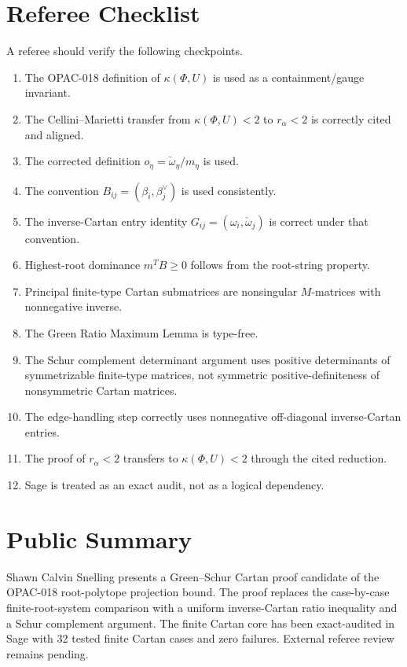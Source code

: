 \documentclass[11pt]{book}
\theoremstyle{definition}
\newcommand{\GS}{Green--Schur}
\begin{document}
\chapter{Referee Checklist}
A referee should verify the following checkpoints.
\begin{enumerate}
\item The OPAC-018 definition of $\kappa(\Phi,U)$ is used as a containment/gauge invariant.
\item The Cellini--Marietti transfer from $\kappa(\Phi,U)<2$ to $r_\alpha<2$ is correctly cited and aligned.
\item The corrected definition $o_\eta=\check\omega_\eta/m_\eta$ is used.
\item The convention $B_{ij}=(\beta_i,\beta_j^\vee)$ is used consistently.
\item The inverse-Cartan entry identity $G_{ij}=(\omega_i,\check\omega_j)$ is correct under that convention.
\item Highest-root dominance $m^TB\ge0$ follows from the root-string property.
\item Principal finite-type Cartan submatrices are nonsingular $M$-matrices with nonnegative inverse.
\item The Green Ratio Maximum Lemma is type-free.
\item The Schur complement determinant argument uses positive determinants of symmetrizable finite-type matrices, not symmetric positive-definiteness of nonsymmetric Cartan matrices.
\item The edge-handling step correctly uses nonnegative off-diagonal inverse-Cartan entries.
\item The proof of $r_\alpha<2$ transfers to $\kappa(\Phi,U)<2$ through the cited reduction.
\item Sage is treated as an exact audit, not as a logical dependency.
\end{enumerate}

\chapter{Public Summary}
Shawn Calvin Snelling presents a \GS{} Cartan proof candidate of the OPAC-018 root-polytope projection bound. The proof replaces the case-by-case finite-root-system comparison with a uniform inverse-Cartan ratio inequality and a Schur complement argument. The finite Cartan core has been exact-audited in Sage with 32 tested finite Cartan cases and zero failures. External referee review remains pending.
\end{document}
